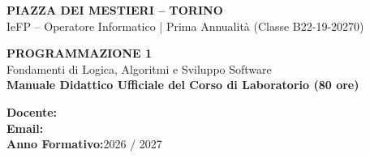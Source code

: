\documentclass[11pt,a4paper,openany]{book}
\begin{document}
\begin{titlepage}
  \pagecolor{PiazzaPaper}

  \begin{flushleft}
    {\fontsize{13}{16}\selectfont\bfseries\color{PiazzaPrimary}PIAZZA DEI MESTIERI -- TORINO}\\[0.25em]
    {\fontsize{10}{13}\selectfont\color{PiazzaGray}IeFP -- Operatore Informatico | Prima Annualità (Classe B22-19-20270)}
  \end{flushleft}

  \vspace{3.5cm}

  \noindent{\color{PiazzaPrimary}\rule{\textwidth}{3pt}}
  \vspace{1.5cm}

  \begin{flushleft}
    {\fontsize{34}{40}\selectfont\bfseries\color{PiazzaDark}PROGRAMMAZIONE 1}\\[0.5em]
    {\fontsize{18}{22}\selectfont\color{PiazzaGray}Fondamenti di Logica, Algoritmi e Sviluppo Software}\\[1.5em]
    {\fontsize{11}{14}\selectfont\color{PiazzaPrimary}\bfseries Manuale Didattico Ufficiale del Corso di Laboratorio (80 ore)}
  \end{flushleft}

  \vspace{1.5cm}
  \noindent{\color{PiazzaPrimary!40}\rule{\textwidth}{1pt}}

  \vfill

  \begin{flushleft}
    \textbf{\color{PiazzaDark}Docente:}\\
    \textbf{\color{PiazzaDark}Email:}\\
    \textbf{\color{PiazzaDark}Anno Formativo:}\hspace{0.5em}2026 / 2027
  \end{flushleft}

  \restoregeometry
\end{titlepage}
\pagecolor{white}

\frontmatter
\end{document}

